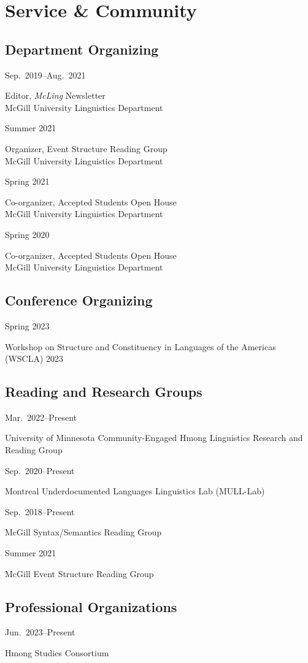 \documentclass[11pt,oneside,DIV=9,parskip=off]{scrarticle} %
\newlength{\leftcolwidth}
\newlength{\rightcolwidth}
\newlength{\spacingbefore}
\newlength{\spacingafter}
\newcommand{\mytwocol}[2]{%
	\vspace{\spacingbefore}%
	\begin{minipage}[t]{\leftcolwidth}%
		\strut#1%
	\end{minipage}%
	\begin{minipage}[t]{\rightcolwidth}%
		\strut#2%
	\end{minipage}%
	\vspace{\spacingafter}\par%
	}
\newcommand{\cvline}[2]{%
	\mytwocol{#1}{#2}%
	}
\begin{document}

\section{Service \& Community}

\subsection{Department Organizing}
\cvline{Sep.\ 2019--Aug.\ 2021}{Editor, \textit{McLing} Newsletter\\McGill University Linguistics Department}
\cvline{Summer 2021}{Organizer, Event Structure Reading Group\\McGill University Linguistics Department}
\cvline{Spring 2021}{Co-organizer, Accepted Students Open House\\McGill University Linguistics Department}
\cvline{Spring 2020}{Co-organizer, Accepted Students Open House\\McGill University Linguistics Department}

\subsection{Conference Organizing}
\cvline{Spring 2023}{Workshop on Structure and Constituency in Languages of the Americas (WSCLA) 2023}

\subsection{Reading and Research Groups}
\cvline{Mar.\ 2022--Present}{University of Minnesota Community-Engaged Hmong Linguistics Research and Reading Group}
\cvline{Sep.\ 2020--Present}{Montreal Underdocumented Languages Linguistics Lab (MULL-Lab)}
\cvline{Sep.\ 2018--Present}{McGill Syntax/Semantics Reading Group}
\cvline{Summer 2021}{McGill Event Structure Reading Group}

\subsection{Professional Organizations}
\cvline{Jun.\ 2023--Present}{Hmong Studies Consortium}
\end{document}
